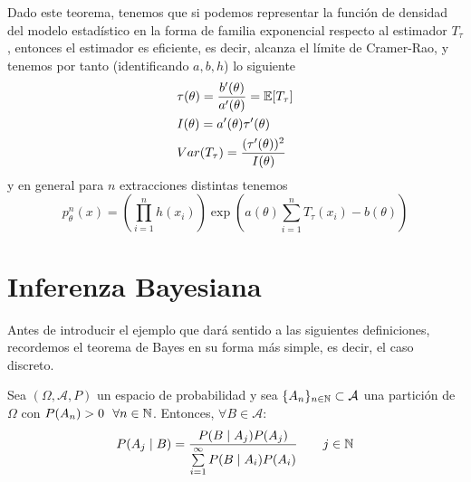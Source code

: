 \noindent
Dado este teorema, tenemos que si podemos representar la función de densidad del modelo estadístico en la forma de familia exponencial respecto al estimador $T_{\tau}$, entonces el estimador es eficiente, es decir, alcanza el límite de Cramer-Rao, y tenemos por tanto (identificando $a,b,h$) lo siguiente
\begin{align*}
    &\tau(\theta)=\dfrac{b'(\theta)}{a'(\theta)}=\mathbb{E}[T_{\tau}] \\
    &I(\theta)=a'(\theta)\tau'(\theta) \\
    &Var(T_{\tau})=\dfrac{(\tau'(\theta))^2}{I(\theta)}
\end{align*}
y en general para $n$ extracciones distintas tenemos
\begin{equation*}
    p_{\theta}^n(x)=(\prod_{i=1}^n h(x_i))\exp\left(a(\theta)\sum_{i=1}^n T_{\tau}(x_i)-b(\theta)\right)
\end{equation*}

\section{Inferenza Bayesiana}
\noindent
Antes de introducir el ejemplo que dará sentido a las siguientes definiciones, recordemos el teorema de Bayes en su forma más simple, es decir, el caso discreto. 

\begin{teo}
    Sea $(\Omega, \mathcal{A}, P)$ un espacio de probabilidad y sea $\{A_n\}_{n \in \mathbb{N}} \subset \mathcal{A}$ una partición de $\Omega$ con $P(A_n)>0~~\forall n \in \mathbb{N}$. Entonces, $\forall B \in \mathcal{A}$:
    $$P(A_j \mid B) = \dfrac{P(B \mid A_j)P(A_j)}{\sum\limits_{i=1}^\infty P(B \mid A_i)P(A_i)}\qquad j \in \mathbb{N}$$
  \end{teo}

